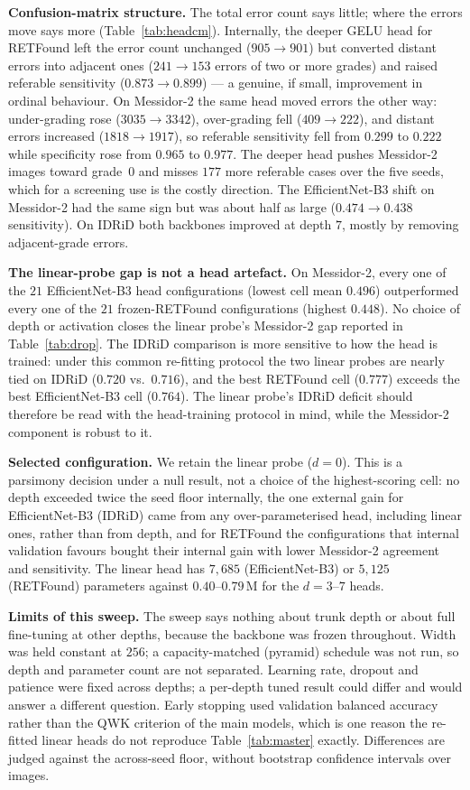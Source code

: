 \documentclass[journal]{IEEEtran}
\renewcommand{\_}{\origunderscore\allowbreak}
\begin{document}
\textbf{Confusion-matrix structure.} The total error count says little; where
the errors move says more (Table~\ref{tab:headcm}). Internally, the deeper GELU
head for RETFound left the error count unchanged ($905\to901$) but converted
distant errors into adjacent ones ($241\to153$ errors of two or more grades) and
raised referable sensitivity ($0.873\to0.899$) --- a genuine, if small,
improvement in ordinal behaviour. On Messidor-2 the same head moved errors the
other way: under-grading rose ($3035\to3342$), over-grading fell
($409\to222$), and distant errors increased ($1818\to1917$), so referable
sensitivity fell from $0.299$ to $0.222$ while specificity rose from $0.965$ to
$0.977$. The deeper head pushes Messidor-2 images toward grade~$0$ and misses
$177$ more referable cases over the five seeds, which for a screening use is the
costly direction. The EfficientNet-B3 shift on Messidor-2 had the same sign but was
about half as large ($0.474\to0.438$ sensitivity). On IDRiD both backbones
improved at depth $7$, mostly by removing adjacent-grade errors.

\textbf{The linear-probe gap is not a head artefact.} On Messidor-2, every one
of the $21$ EfficientNet-B3 head configurations (lowest cell mean $0.496$)
outperformed every one of the $21$ frozen-RETFound configurations (highest
$0.448$). No choice of depth or activation closes the linear probe's Messidor-2
gap reported in Table~\ref{tab:drop}. The IDRiD comparison is more sensitive to how the head is
trained: under this common re-fitting protocol the two linear probes are nearly
tied on IDRiD ($0.720$ vs.\ $0.716$), and the best RETFound cell ($0.777$)
exceeds the best EfficientNet-B3 cell ($0.764$). The linear probe's IDRiD
deficit should therefore be read with the head-training protocol in mind, while
the Messidor-2 component is robust to it.

\textbf{Selected configuration.} We retain the linear probe ($d=0$). This is a
parsimony decision under a null result, not a choice of the highest-scoring
cell: no depth exceeded twice the seed floor internally, the one external gain
for EfficientNet-B3 (IDRiD) came from any over-parameterised head, including
linear ones, rather than from depth, and for RETFound the configurations that
internal validation favours bought their internal gain with lower Messidor-2
agreement and sensitivity. The linear head has $7{,}685$ (EfficientNet-B3) or
$5{,}125$ (RETFound) parameters against $0.40$--$0.79$\,M for the $d=3$--$7$
heads.

\textbf{Limits of this sweep.} The sweep says nothing about trunk depth or about
full fine-tuning at other depths, because the backbone was frozen throughout.
Width was held constant at $256$; a capacity-matched (pyramid) schedule was not
run, so depth and parameter count are not separated. Learning rate, dropout and
patience were fixed across depths; a per-depth tuned result could differ and
would answer a different question. Early stopping used validation balanced
accuracy rather than the QWK criterion of the main models, which is one reason
the re-fitted linear heads do not reproduce Table~\ref{tab:master} exactly.
Differences are judged against the across-seed floor, without bootstrap
confidence intervals over images.
\end{document}
